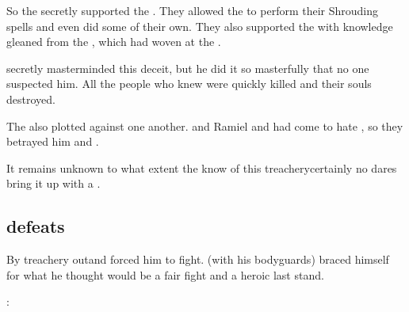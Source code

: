 So the \satharioth{} secretly supported the \SecondShrouding{}. 
They allowed the \dragons{} to perform their Shrouding spells and even did some of their own. 
They also supported the \dragons{} with knowledge gleaned from the , which \Daggerrain{} had woven at the . 

\Azraid{} secretly masterminded this deceit, but he did it so masterfully that no one suspected him. 
All the people who knew were quickly killed and their souls destroyed. 

The \satharioth also plotted against one another. 
\Netzachirah and Ramiel and \Azraid had come to hate \Morcariel, so they betrayed him and . 


It remains unknown to what extent the \banes{} know of this treachery\dash certainly no \resphan{} dares bring it up with a \banelord. 









\subsection{\Secherdamon defeats \Morcariel}
By treachery \Secherdamon out\manoeuvred \Morcariel and forced him to fight. 
\Morcariel (with his bodyguards) braced himself for what he thought would be a fair fight and a heroic last stand. 

\Secherdamon:

